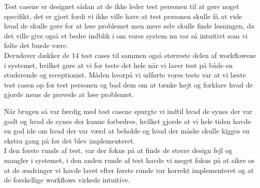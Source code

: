 Test casene er designet sådan at de ikke leder test personen til at gøre noget specifikt, det er gjort fordi vi ikke ville have at test personen skulle få at vide hvad de skulle gøre for at løse problemet men mere selv skulle finde løsningen, da det ville give også et bedre indblik i om vores system nu var så intuitivt som vi følte det burde være.\\ Derudover dækker de 14 test cases til sammen også størreste delen af workflowsne i systemet, hvilket gøre at vi for teste det hele når vi laver test på både en studerende og receptionist. Måden hvorpå vi udførte vores tests var at vi læste test casen op for test personen og  bad dem om at tænke højt og forklare hvad de gjorde mens de prøvede at løse problemet. 


Når brugen så var færdig med test casene spurgte vi indtil hvad de synes der var godt og hvad de synes der kunne forbedres, hvilket gjorde at vi hele tiden havde en god ide om hvad der var værd at beholde og hvad der måske skulle kigges en ekstra gang på før det blev implementeret.\\ I den første runde af test, var der fokus på at finde de større design fejl og mangler i systemet,  i den anden runde af test havde vi meget fokus på at sikre os at de ændringer vi havde lavet efter første runde var korrekt implementeret og at de forskellige workflows virkede intuitive.

